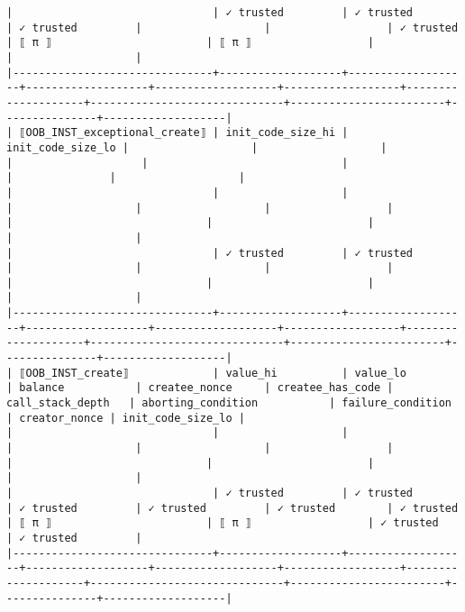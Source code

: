 \documentclass[varwidth=\maxdimen,margin=0.5cm,multi={verbatim}]{standalone}
\begin{document}
\begin{verbatim}
|                               | ✓ trusted         | ✓ trusted         | ✓ trusted         |                   |                  | ✓ trusted          | ⟦ π ⟧                        | ⟦ π ⟧                  |               |                   |
|-------------------------------+-------------------+-------------------+-------------------+-------------------+------------------+--------------------+------------------------------+------------------------+---------------+-------------------|
| ⟦OOB_INST_exceptional_create⟧ | init_code_size_hi | init_code_size_lo |                   |                   |                  |                    |                              |                        |               |                   |
|                               |                   |                   |                   |                   |                  |                    |                              |                        |               |                   |
|                               | ✓ trusted         | ✓ trusted         |                   |                   |                  |                    |                              |                        |               |                   |
|-------------------------------+-------------------+-------------------+-------------------+-------------------+------------------+--------------------+------------------------------+------------------------+---------------+-------------------|
| ⟦OOB_INST_create⟧             | value_hi          | value_lo          | balance           | createe_nonce     | createe_has_code | call_stack_depth   | aborting_condition           | failure_condition      | creator_nonce | init_code_size_lo |
|                               |                   |                   |                   |                   |                  |                    |                              |                        |               |                   |
|                               | ✓ trusted         | ✓ trusted         | ✓ trusted         | ✓ trusted         | ✓ trusted        | ✓ trusted          | ⟦ π ⟧                        | ⟦ π ⟧                  | ✓ trusted     | ✓ trusted         |
|-------------------------------+-------------------+-------------------+-------------------+-------------------+------------------+--------------------+------------------------------+------------------------+---------------+-------------------|

\end{verbatim}
\end{document}
